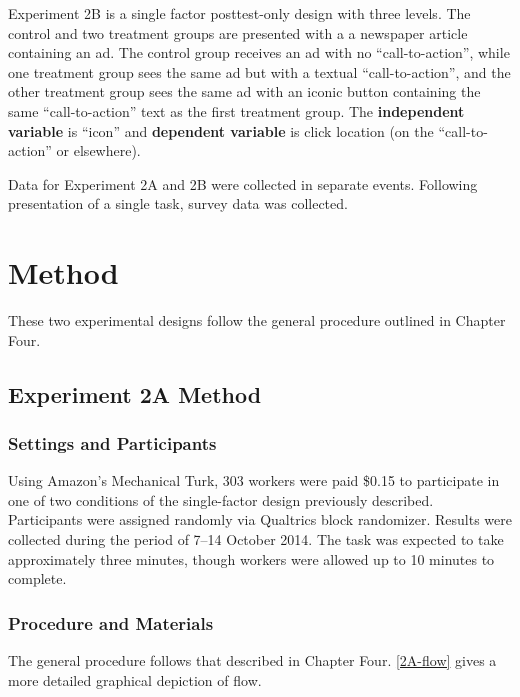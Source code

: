 Experiment 2B is a single factor posttest-only design with three levels. The control and two treatment groups are presented with a a newspaper article containing an ad. The control group receives an ad with no ``call-to-action'', while one treatment group sees the same ad but with a textual ``call-to-action'', and the other treatment group sees the same ad with an iconic button containing the same ``call-to-action'' text as the first treatment group. The \textbf{independent variable} is ``icon'' and \textbf{dependent variable} is click location (on the ``call-to-action'' or elsewhere). 

Data for Experiment 2A and 2B were collected in separate events. Following presentation of a single task, survey data was collected.

\section{Method}
\label{method}

These two experimental designs follow the general procedure outlined in Chapter Four.

\subsection{Experiment 2A Method}
\label{experiment2amethod}

\subsubsection{Settings and Participants}
\label{settingsandparticipants}

Using Amazon's Mechanical Turk, 303 workers were paid \$0.15 to participate in one of two conditions of the single-factor design previously described. Participants were assigned randomly via Qualtrics block randomizer. Results were collected during the period of 7--14 October 2014. The task was expected to take approximately three minutes, though workers were allowed up to 10 minutes to complete.

\subsubsection{Procedure and Materials}
\label{procedureandmaterials}


The general procedure follows that described in Chapter Four. \autoref{2A-flow} gives a more detailed graphical depiction of flow.


